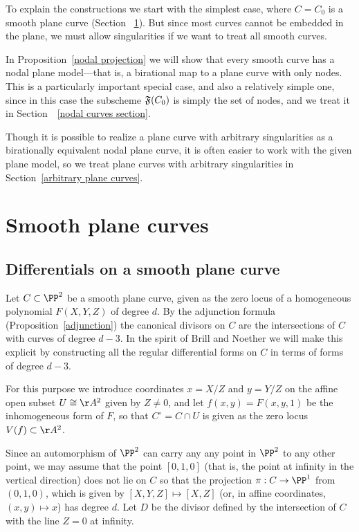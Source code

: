 To explain the constructions  we start with the simplest case, where $C = C_0$ is a smooth plane curve (Section~ \ref{smooth plane curves}). But since most curves cannot be embedded in the plane, we must
allow singularities if we want to treat all smooth curves. 

In Proposition~\ref{nodal projection}  we will show that every smooth curve has a nodal plane model---that is,
a birational map to a plane curve with only nodes. This is a particularly
important special case, and also a relatively simple one, since in this case the subscheme $\adj(C_{0})$
is simply the set of nodes,
and we treat it in Section~~\ref{nodal curves section}. 

Though it is possible to realize a plane curve with arbitrary singularities as a birationally
equivalent nodal plane curve, it is often easier to work with the given plane model, so we treat
plane curves with arbitrary singularities in Section~\ref{arbitrary plane curves}. 

\section{Smooth plane curves}\label{smooth plane curves}

\subsection{Differentials on a smooth plane curve}\label{canonical series on smooth plane curves}

Let $C \subset \PP^2$  be a smooth plane curve, given as the zero locus of a homogeneous polynomial $F(X,Y,Z)$ of degree $d$. By the adjunction formula (Proposition~\ref{adjunction}) the canonical  divisors on $C$
are the intersections of $C$ with curves of degree $d-3$. In the spirit of Brill and Noether we
will make this explicit by constructing all
 the regular differential forms on $C$ in terms of forms of degree $d-3$.


For this purpose we introduce coordinates $x = X/Z$ and $y = Y/Z$ on the affine open subset $U \cong \AA^2$ given by $Z \neq 0$, and let $f(x,y) = F(x, y,1)$ be the inhomogeneous form of $F$, so that $C^\circ = C \cap U$ is given as the zero locus $V(f) \subset  \AA^2$. 

Since an automorphism of $\PP^2$ can carry any  any point in $\PP^{2}$ to any other point, we may assume
that 
 the point $[0,1,0]$ (that is, the point at infinity in the vertical direction) does not lie on $C$ so that the
 projection  $\pi: C \to \PP^1$ from $(0,1,0)$, which is given by $[X,Y,Z] \mapsto [X,Z]$ (or, in affine coordinates, $(x,y) \mapsto x$)  has degree $d$. Let $D$ be the divisor defined by the intersection of $C$ with the line $Z=0$ at infinity.

